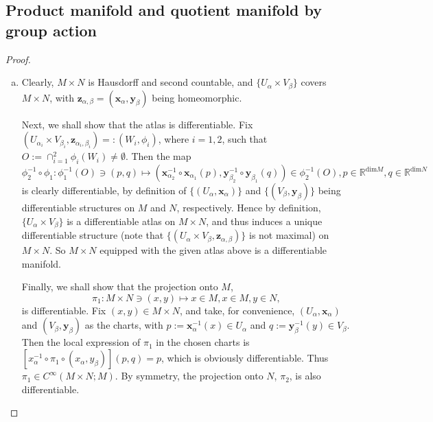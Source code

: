 {

\subsection{Product manifold and quotient manifold by group action}

\newcommand*{\x}{\mathbf{x}}
\newcommand*{\y}{\mathbf{y}}
\newcommand*{\z}{\mathbf{z}}
\newcommand*{\iso}[1]{\stackrel{\mathrm{#1.}}{\cong}}

\begin{proof}
\begin{enumerate}[(a)]
	\item
	Clearly, $M \times N$ is Hausdorff and second countable, and $\{U_\alpha \times V_\beta\}$ covers $M \times N$, with $\z_{\alpha,\beta}=(\x_\alpha,\y_\beta)$ being homeomorphic.
	\par
	Next, we shall show that the atlas is differentiable. Fix $(U_{\alpha_i} \times V_{\beta_i}, \z_{\alpha_i,\beta_i}) =: (W_i,\phi_i)$, where $i=1,2$, such that $O := \cap_{i=1}^2 \phi_i(W_i) \ne \emptyset$. Then the map
	\[\phi_2^{-1} \circ \phi_1: \phi_1^{-1}(O) \ni (p,q) \mapsto \left(\x_{\alpha_2}^{-1} \circ \x_{\alpha_1}(p), \y_{\beta_2}^{-1} \circ \y_{\beta_1}(q)\right) \in \phi_2^{-1}(O), p\in\mathbb{R}^{\mathrm{dim }M}, q\in\mathbb{R}^{\mathrm{dim }N}\]
	is clearly differentiable, by definition of $\{(U_\alpha,\x_\alpha)\}$ and $\{(V_\beta,\y_\beta)\}$ being differentiable structures on $M$ and $N$, respectively. Hence by definition, $\{U_\alpha \times V_\beta\}$ is a differentiable atlas on $M \times N$, and thus induces a unique differentiable structure (note that $\{(U_\alpha \times V_\beta,\z_{\alpha,\beta})\}$ is not maximal) on $M \times N$. So $M \times N$ equipped with the given atlas above is a differentiable manifold.
	\par
	Finally, we shall show that the projection onto $M$, 
	\[\pi_1: M \times N \ni (x,y) \mapsto x \in M, x \in M, y \in N,\]
	is differentiable. Fix $(x,y) \in M \times N$, and take, for convenience, $(U_\alpha, \x_\alpha)$ and $(V_\beta, \y_\beta)$ as the charts, with $p:= \x_\alpha^{-1}(x) \in U_\alpha$ and $q:= \y_\beta^{-1}(y) \in V_\beta$. Then the local expression of $\pi_1$ in the chosen charts is $\left[x_\alpha^{-1} \circ \pi_1 \circ (x_\alpha, y_\beta)\right](p,q) = p$, which is obviously differentiable. Thus $\pi_1 \in C^\infty(M \times N; M)$.	By symmetry, the projection onto $N$, $\pi_2$, is also differentiable.
	

\end{enumerate}
\end{proof}}
